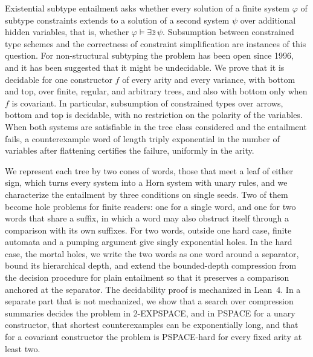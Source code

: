 Existential subtype entailment asks whether every solution of a finite system
$\varphi$ of subtype constraints extends to a solution of a second system
$\psi$ over additional hidden variables, that is, whether
$\varphi\models\exists\bar z\,\psi$. Subsumption between constrained type
schemes and the correctness of constraint simplification are instances of this
question. For non-structural subtyping the problem has been open since 1996,
and it has been suggested that it might be undecidable. We prove that it is
decidable for one constructor $f$ of every arity and every variance, with
bottom and top, over finite, regular, and arbitrary trees, and also with bottom
only when $f$ is covariant. In particular, subsumption of constrained types
over arrows, bottom and top is decidable, with no restriction on the polarity
of the variables. When both systems are satisfiable in the tree class
considered and the entailment fails, a counterexample word of length triply
exponential in the number of variables after flattening certifies the failure,
uniformly in the arity.

We represent each tree by two cones of words, those that meet a leaf of either
sign, which turns every system into a Horn system with unary rules, and we
characterize the entailment by three conditions on single seeds. Two of them
become hole problems for finite readers: one for a single word, and one for two
words that share a suffix, in which a word may also obstruct itself through a
comparison with its own suffixes. For two words, outside one hard case, finite
automata and a pumping argument give singly exponential holes. In the hard
case, the mortal holes, we write the two words as one word around a separator, bound its
hierarchical depth, and extend the bounded-depth compression from the decision
procedure for plain entailment so that it preserves a comparison anchored at the
separator. The decidability proof is mechanized in Lean~4. In a separate part
that is not mechanized, we show that a search over compression summaries
decides the problem in 2-EXPSPACE, and in PSPACE for a unary constructor, that
shortest counterexamples can be exponentially long, and that for a covariant
constructor the problem is PSPACE-hard for every fixed arity at least two.
